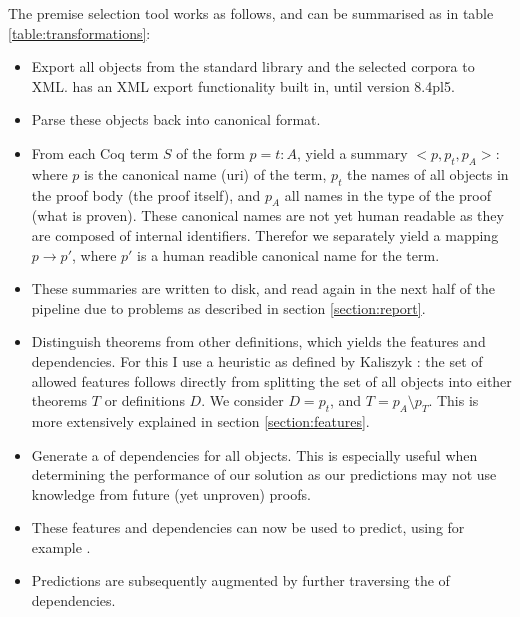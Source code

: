 The premise selection tool works as follows, and can be summarised as in table \ref{table:transformations}:
\begin{itemize}
    \item Export all \coq objects from the standard library and the selected corpora to XML.
		\coq has an XML export functionality built in, until version 8.4pl5.
	\item Parse these objects back into canonical \acic format.
	\item From each Coq term $S$ of the form $p = t : A$, yield a summary $<p, p_t, p_A>$:
		where $p$ is the canonical name (uri) of the term,
		$p_t$ the names of all objects in the proof body (the proof itself),
		and $p_A$ all names in the type of the proof (what is proven).
		These canonical names are not yet human readable as they are composed of internal identifiers.
		Therefor we separately yield a mapping $p \rightarrow p'$, where $p'$ is a human readible canonical name for the term.
	\item These summaries are written to disk, and read again in the next half of the pipeline due to problems as described in section \ref{section:report}.
	\item Distinguish theorems from other definitions, which yields the features and dependencies.
		For this I use a heuristic as defined by Kaliszyk \cite{kaliszyk2014machine}:
		the set of allowed features follows directly from splitting the set of all objects into either theorems $T$ or definitions $D$.
		We consider $D = p_t$, and $T = p_A \setminus p_T$.
		This is more extensively explained in section \ref{section:features}.
    \item Generate a \dagraph of dependencies for all \coq objects.
		This is especially useful when determining the performance of our solution as our predictions may not use
		knowledge from future (yet unproven) proofs.
	\item These features and dependencies can now be used to predict, using for example \knn.
	\item Predictions are subsequently augmented by further traversing the \dagraph of dependencies.
\end{itemize}

